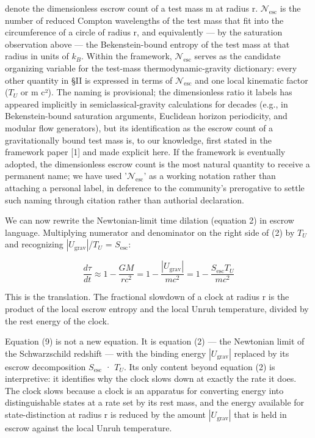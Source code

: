 \documentclass[11pt]{article}
\begin{document}
denote the dimensionless escrow count of a test mass m at radius r.
$\mathcal{N}_{\mathrm{esc}}$ is the number of reduced Compton wavelengths of the test mass that
fit into the circumference of a circle of radius r, and equivalently ---
by the saturation observation above --- the Bekenstein-bound entropy of
the test mass at that radius in units of $k_{B}$. Within the framework,
$\mathcal{N}_{\mathrm{esc}}$ serves as the candidate organizing variable for the test-mass
thermodynamic-gravity dictionary: every other quantity in §II is
expressed in terms of $\mathcal{N}_{\mathrm{esc}}$ and one local kinematic factor ($T_{U}$ or m
c²). The naming is provisional; the dimensionless ratio it labels has
appeared implicitly in semiclassical-gravity calculations for decades
(e.g., in Bekenstein-bound saturation arguments, Euclidean horizon
periodicity, and modular flow generators), but its identification as the
escrow count of a gravitationally bound test mass is, to our knowledge,
first stated in the framework paper [1] and made explicit here. If the
framework is eventually adopted, the dimensionless escrow count is the
most natural quantity to receive a permanent name; we have used
'$\mathcal{N}_{\mathrm{esc}}$' as a working notation rather than attaching a personal label,
in deference to the community's prerogative to settle such naming
through citation rather than authorial declaration.

We can now rewrite the Newtonian-limit time dilation (equation 2) in
escrow language. Multiplying numerator and denominator on the right side
of (2) by $T_{U}$ and recognizing $|U_{\mathrm{grav}}|$/$T_{U}$ = $S_{\mathrm{esc}}$:

\begin{equation}
  \frac{d\tau}{dt} \approx 1 - \frac{GM}{rc^{2}} = 1 - \frac{|U_{\mathrm{grav}}|}{mc^{2}} = 1 - \frac{S_{\mathrm{esc}} T_{U}}{mc^{2}}
  \label{eq:9}
\end{equation}

This is the translation. The fractional slowdown of a clock at radius r
is the product of the local escrow entropy and the local Unruh
temperature, divided by the rest energy of the clock.

Equation (9) is not a new equation. It is equation (2) --- the Newtonian
limit of the Schwarzschild redshift --- with the binding energy
$|U_{\mathrm{grav}}|$ replaced by its escrow decomposition $S_{\mathrm{esc}}$ · $T_{U}$. Its only
content beyond equation (2) is interpretive: it identifies why the clock
slows down at exactly the rate it does. The clock slows because a clock
is an apparatus for converting energy into distinguishable states at a
rate set by its rest mass, and the energy available for
state-distinction at radius r is reduced by the amount $|U_{\mathrm{grav}}|$ that
is held in escrow against the local Unruh temperature.
\end{document}
